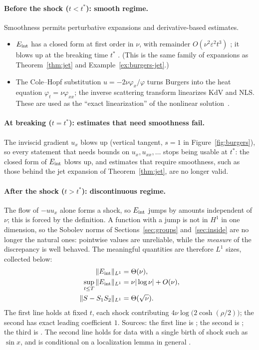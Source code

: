 \paragraph{Before the shock ($t<t^*$): smooth regime.} Smoothness permits perturbative expansions and derivative-based estimates.
\begin{itemize}[nosep]
\item $E_{\mathrm{int}}$ has a closed form at first order in $\nu$, with remainder $O(\nu^2\varepsilon^2t^3)$  \proved; it blows up at the breaking time $t^*$ . (This is the same family of expansions as Theorem~\ref{thm:jet} and Example~\ref{ex:burgers-jet}.)
\item The Cole--Hopf substitution $u=-2\nu\varphi_x/\varphi$ turns Burgers into the heat equation $\varphi_t=\nu\varphi_{xx}$; the inverse scattering transform linearizes KdV and NLS. These are used as the ``exact linearization'' of the nonlinear solution~\cite{ch}.
\end{itemize}
\paragraph{At breaking ($t=t^*$): estimates that need smoothness fail.} The inviscid gradient $u_x$ blows up (vertical tangent, $s=1$ in Figure~\ref{fig:burgers}), so every statement that needs bounds on $u_x,u_{xx},\dots$ stops being usable at $t^*$: the closed form of $E_{\mathrm{int}}$ blows up, and estimates that require smoothness, such as those behind the jet expansion of Theorem~\ref{thm:jet}, are no longer valid.
\paragraph{After the shock ($t>t^*$): discontinuous regime.}
The flow of $-uu_x$ alone forms a shock, so $E_{\mathrm{int}}$ jumps by amounts independent of $\nu$; this is forced by the definition. A function with a jump is not in $H^1$ in one dimension, so the Sobolev norms of Sections~\ref{sec:groups} and~\ref{sec:inside} are no longer the natural ones: pointwise values are unreliable, while the \emph{measure} of the discrepancy is well behaved. The meaningful quantities are therefore $L^1$ sizes, collected below:
\begin{align}
\|E_{\mathrm{int}}\|_{L^1}&=\Theta(\nu),\\
\sup_{t\le T}\|E_{\mathrm{int}}\|_{L^1}&=\nu|\log\nu|+O(\nu),\\
\|S-S_1S_2\|_{L^1}&=\Theta(\sqrt\nu).
\end{align}
The first line holds at fixed $t$, each shock contributing $4\nu\log\!\big(2\cosh(\rho/2)\big)$; the second has exact leading coefficient $1$. Sources: the first line is  ; the second is ; the third is  \proved.
The second line holds for data with a single birth of shock such as $\sin x$, and is conditional on a localization lemma in general \condl{}.

